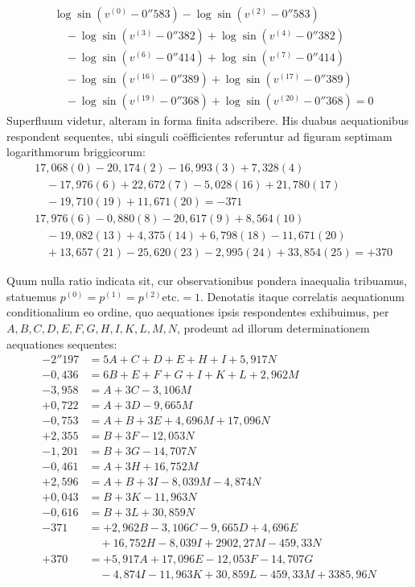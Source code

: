 \[
\begin{aligned}
&\log\sin(v^{(0)}-0''583)-\log\sin(v^{(2)}-0''583)\\
&\quad-\log\sin(v^{(3)}-0''382)+\log\sin(v^{(4)}-0''382)\\
&\quad-\log\sin(v^{(6)}-0''414)+\log\sin(v^{(7)}-0''414)\\
&\quad-\log\sin(v^{(16)}-0''389)+\log\sin(v^{(17)}-0''389)\\
&\quad-\log\sin(v^{(19)}-0''368)+\log\sin(v^{(20)}-0''368)=0
\end{aligned}
\]
Superfluum videtur, alteram in forma finita adscribere. His duabus aequationibus respondent sequentes, ubi singuli coëfficientes referuntur ad figuram septimam logarithmorum briggicorum:
\[
\begin{aligned}
&17{,}068(0)-20{,}174(2)-16{,}993(3)+7{,}328(4)\\
&\quad-17{,}976(6)+22{,}672(7)-5{,}028(16)+21{,}780(17)\\
&\quad-19{,}710(19)+11{,}671(20)=-371\\[5pt]
&17{,}976(6)-0{,}880(8)-20{,}617(9)+8{,}564(10)\\
&\quad-19{,}082(13)+4{,}375(14)+6{,}798(18)-11{,}671(20)\\
&\quad+13{,}657(21)-25{,}620(23)-2{,}995(24)+33{,}854(25)=+370
\end{aligned}
\]

Quum nulla ratio indicata sit, cur observationibus pondera inaequalia tribuamus, statuemus \(p^{(0)}=p^{(1)}=p^{(2)}\text{etc.}=1\). Denotatis itaque correlatis aequationum conditionalium eo ordine, quo aequationes ipsis respondentes exhibuimus, per \(A,\allowbreak B,\allowbreak C,\allowbreak D,\allowbreak E,\allowbreak F,\allowbreak G,\allowbreak H,\allowbreak I,\allowbreak K,\allowbreak L,\allowbreak M,\allowbreak N\), prodeunt ad illorum determinationem aequationes sequentes:
\[
\begin{aligned}
-2''197&=5A+C+D+E+H+I+5{,}917N\\
-0{,}436&=6B+E+F+G+I+K+L+2{,}962M\\
-3{,}958&=A+3C-3{,}106M\\
+0{,}722&=A+3D-9{,}665M\\
-0{,}753&=A+B+3E+4{,}696M+17{,}096N\\
+2{,}355&=B+3F-12{,}053N\\
-1{,}201&=B+3G-14{,}707N\\
-0{,}461&=A+3H+16{,}752M\\
+2{,}596&=A+B+3I-8{,}039M-4{,}874N\\
+0{,}043&=B+3K-11{,}963N\\
-0{,}616&=B+3L+30{,}859N\\
-371&=+2{,}962B-3{,}106C-9{,}665D+4{,}696E\\
&\quad+16{,}752H-8{,}039I+2902{,}27M-459{,}33N\\
+370&=+5{,}917A+17{,}096E-12{,}053F-14{,}707G\\
&\quad-4{,}874I-11{,}963K+30{,}859L-459{,}33M+3385{,}96N
\end{aligned}
\]

